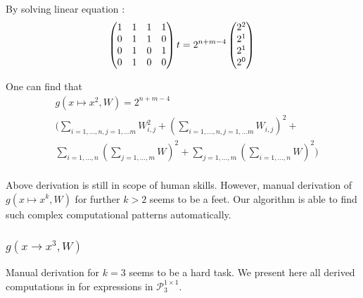 \documentclass{article}
\begin{document}
 By solving linear equation :
 \begin{equation}
 \begin{pmatrix} 
  1 & 1 & 1 & 1 \\ 
  0 & 1 & 1 & 0 \\ 
  0 & 1 & 0 & 1 \\ 
  0 & 1 & 0 & 0 \\     
\end{pmatrix}t = 2^{n + m - 4}\begin{pmatrix} 
  2^{2}\\ 
  2^{1}\\ 
  2^{1}\\ 
  2^{0}\\     
\end{pmatrix} \\
 \end{equation}

One can find that 
\begin{align*}
	&g(x \mapsto x^2, W) = 2^{n + m - 4} \\ 
 &\Big(\sum_{i = 1, \dots, n, j = 1, \dots m} W_{i, j}^2 + (\sum_{i = 1, \dots, n, j = 1, \dots m} W_{i, j})^2 + \\
 &\sum_{i = 1, \dots, n}(\sum_{j = 1, \dots, m} W)^2 + \sum_{j = 1, \dots, m}(\sum_{i = 1, \dots, n} W)^2 \Big)\\
\end{align*}

Above derivation is still in scope of human skills. However, manual derivation
of $g(x \mapsto x^k, W)$ for further $k > 2$  seems to be a feet. Our algorithm
is able to find such complex computational patterns automatically. 

\subsubsection{$g(x \rightarrow x^3, W)$}
Manual derivation for $k = 3$ seems to be a hard task. We present here all derived computations in
for expressions in $\mathcal{P}^{1 \times 1}_3$. 
\end{document}
